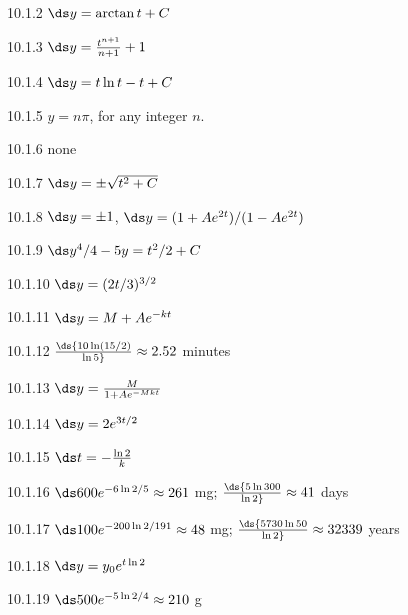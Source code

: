 \begin{Answer}{10.1.2}
 $\ds y=\arctan t + C$
\end{Answer}
\begin{Answer}{10.1.3}
 $\ds y={t^{n+1}\over n+1}+1$
\end{Answer}
\begin{Answer}{10.1.4}
 $\ds y=t\ln t-t+C$
\end{Answer}
\begin{Answer}{10.1.5}
 $y=n\pi$, for any integer $n$.
\end{Answer}
\begin{Answer}{10.1.6}
 none
\end{Answer}
\begin{Answer}{10.1.7}
 $\ds y=\pm\sqrt{t^2+C}$
\end{Answer}
\begin{Answer}{10.1.8}
 $\ds y=\pm 1$, $\ds y=(1+Ae^{2t})/(1-Ae^{2t})$
\end{Answer}
\begin{Answer}{10.1.9}
 $\ds y^4/4-5y=t^2/2+C$
\end{Answer}
\begin{Answer}{10.1.10}
 $\ds y=(2t/3)^{3/2}$
\end{Answer}
\begin{Answer}{10.1.11}
 $\ds y=M+Ae^{-kt}$
\end{Answer}
\begin{Answer}{10.1.12}
 $\ds {10\ln(15/2)\over\ln 5}\approx 2.52$ minutes
\end{Answer}
\begin{Answer}{10.1.13}
 $\ds y={M\over 1+Ae^{-Mkt}}$
\end{Answer}
\begin{Answer}{10.1.14}
 $\ds y=2e^{3t/2}$
\end{Answer}
\begin{Answer}{10.1.15}
 $\ds t=-{\ln 2\over k}$
\end{Answer}
\begin{Answer}{10.1.16}
 $\ds 600e^{-6\ln 2/5}\approx 261$ mg; $\ds {5\ln
  300\over\ln2}\approx 41$ days
\end{Answer}
\begin{Answer}{10.1.17}
 $\ds 100e^{-200\ln 2/191}\approx 48$ mg; $\ds {5730\ln
  50\over\ln2}\approx 32339$ years
\end{Answer}
\begin{Answer}{10.1.18}
 $\ds y=y_0e^{t\ln 2}$
\end{Answer}
\begin{Answer}{10.1.19}
 $\ds 500e^{-5\ln2/4}\approx 210$ g
\end{Answer}
